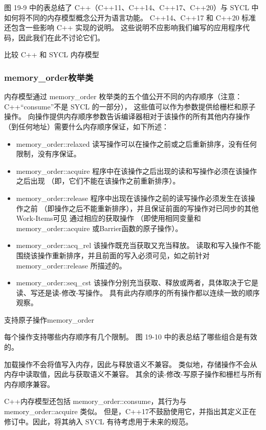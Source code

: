 图 19-9 中的表总结了 C++（C++11、C++14、C++17、C++20）与 SYCL 中如何将不同的内存模型概念公开为语言功能。 
C++14、C++17 和 C++20 标准还包含一些影响 C++ 实现的说明。 
这些说明不应影响我们编写的应用程序代码，因此我们在此不讨论它们。

{\color{red} 比较 C++ 和 SYCL 内存模型}

\subsubsection{memory\_order枚举类}
内存模型通过 memory\_order 枚举类的五个值公开不同的内存顺序（注意：C++“consume”不是 SYCL 的一部分），
这些值可以作为参数提供给栅栏和原子操作。 
向操作提供内存顺序参数告诉编译器相对于该操作的所有其他内存操作（到任何地址）需要什么内存顺序保证，如下所述：

\begin{itemize}
	\item memory\_order::relaxed 读写操作可以在操作之前或之后重新排序，没有任何限制，没有序保证。

	\item memory\_order::acquire 程序中在该操作之后出现的读和写操作必须在该操作之后出现
	（即，它们不能在该操作之前重新排序）。

	\item memory\_order::release 程序中出现在该操作之前的读写操作必须发生在该操作之前
	（即操作之后不能重新排序），并且保证前面的写操作对已同步的其他Work-Items可见 通过相应的获取操作
	（即使用相同变量和 memory\_order::acquire 或Barrier函数的原子操作）。

	\item memory\_order::acq\_rel 该操作既充当获取又充当释放。 
	读取和写入操作不能围绕该操作重新排序，并且前面的写入必须可见，如之前针对 memory\_order::release 所描述的。

	\item memory\_order::seq\_cst 该操作分别充当获取、释放或两者，具体取决于它是读、写还是读-修改-写操作。 
	具有此内存顺序的所有操作都以连续一致的顺序观察。
\end{itemize}

{\color{red} 支持原子操作memory\_order}

每个操作支持哪些内存顺序有几个限制。 图 19-10 中的表总结了哪些组合是有效的。

加载操作不会将值写入内存，因此与释放语义不兼容。 类似地，存储操作不会从内存中读取值，因此与获取语义不兼容。 
其余的读-修改-写原子操作和栅栏与所有内存顺序兼容。

\begin{remark}[C++ 中的内存序]
	C++内存模型还包括 memory\_order::consume，其行为与 memory\_order::acquire 类似。
	但是，C++17不鼓励使用它，并指出其定义正在修订中。因此，将其纳入 SYCL 有待考虑用于未来的规范。
\end{remark}

